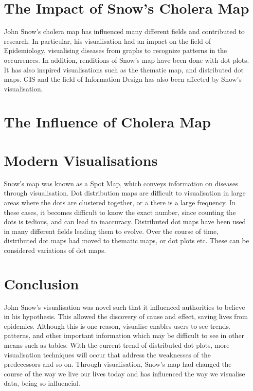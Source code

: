 \documentclass[12pt]{article}
\begin{document}
\section{The Impact of Snow's Cholera Map}
John Snow's cholera map has influenced many different fields and contributed to research. In particular, his visualisation had an impact on the field of Epidemiology, visualising diseases from graphs to recognize patterns in the occurrences. In addition, renditions of Snow's map have been done with dot plots. It has also inspired visualisations such as the thematic map, and distributed dot maps. GIS and the field of Information Design has also been affected by Snow's visualisation. 

\section{The Influence of Cholera Map}

\section{Modern Visualisations}
Snow's map was known as a Spot Map, which conveys information on diseases through visualisation. Dot distribution maps are difficult to visualisation in large areas where the dots are clustered together, or a there is a large frequency. In these cases, it becomes difficult to know the exact number, since counting the dots is tedious, and can lead to inaccuracy. Distributed dot maps have been used in many different fields leading them to evolve. Over the course of time, distributed dot maps had moved to thematic maps, or dot plots etc. These can be considered variations of dot maps. 

\section{Conclusion}
John Snow's visualisation was novel such that it influenced authorities to believe in his hypothesis. This allowed the discovery of cause and effect, saving lives from epidemics. Although this is one reason, visualise enables users to see trends, patterns, and other important information which may be difficult to see in other means such as tables. With the current trend of distributed dot plots, more visualisation techniques will occur that address the weaknesses of the predecessors and so on. Through visualisation, Snow's map had changed the course of the way we live our lives today and has influenced the way we visualise data, being so influencial.

% 
% 




\end{document}
